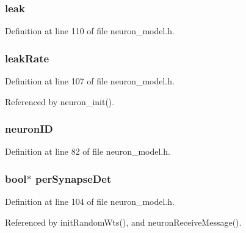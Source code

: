 \subsubsection[{leak}]{ leak}\label{structneuron_state_ad0271f69fc01192f4f85b74d9bee06de}


Definition at line 110 of file neuron\+\_\+model.\+h.

\hypertarget{structneuron_state_afe8da12a0fe0aef0987e785a64619706}{}
\subsubsection[{leak\+Rate}]{ leak\+Rate}\label{structneuron_state_afe8da12a0fe0aef0987e785a64619706}


Definition at line 107 of file neuron\+\_\+model.\+h.



Referenced by neuron\+\_\+init().

\hypertarget{structneuron_state_ab668c4d903557a2ac39f2a5141df3976}{}
\subsubsection[{neuron\+I\+D}]{ neuron\+I\+D}\label{structneuron_state_ab668c4d903557a2ac39f2a5141df3976}


Definition at line 82 of file neuron\+\_\+model.\+h.

\hypertarget{structneuron_state_a95688135a244a3ce3b35698a49d0da18}{}
\subsubsection[{per\+Synapse\+Det}]{\setlength{\rightskip}{0pt plus 5cm}bool$\ast$ per\+Synapse\+Det}\label{structneuron_state_a95688135a244a3ce3b35698a49d0da18}


Definition at line 104 of file neuron\+\_\+model.\+h.



Referenced by init\+Random\+Wts(), and neuron\+Receive\+Message().

